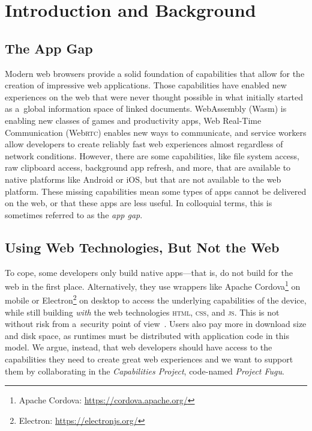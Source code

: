 \documentclass[sigconf]{acmart}
\begin{document}


\maketitle

\section{Introduction and Background}

\subsection{The App Gap}

Modern web browsers provide a solid foundation of capabilities
that allow for the creation of impressive web applications.
Those capabilities have enabled new experiences on the web
that were never thought possible in what initially started as
a~global information space of linked documents.
WebAssembly (Wasm) is enabling new classes of games and productivity apps,
Web Real-Time Communication (Web\textsc{rtc}) enables new ways to communicate,
and service workers allow developers to create reliably fast web experiences
almost regardless of network conditions.
However, there are some capabilities, like file system access,
raw clipboard access, background app refresh, and more,
that are available to native platforms like Android or i\textsc{OS},
but that are not available to the web platform.
These missing capabilities mean some types of apps cannot be delivered on the web,
or that these apps are less useful.
In colloquial terms, this is sometimes referred to as the \textit{app gap}.

\subsection{Using Web Technologies, But Not the Web}

To cope, some developers only build native apps---that is,
do not build for the web in the first place.
Alternatively, they use wrappers like Apache Cordova\footnote{Apache Cordova:
\url{https://cordova.apache.org/}}
on mobile or Electron\footnote{Electron: \url{https://electronjs.org/}} on desktop
to access the underlying capabilities of the device,
while still building \textit{with} the web technologies
\textsc{html}, \textsc{css}, and \textsc{js}.
This is not without risk from a~security point of view~\cite{carettoni17,luo11}.
Users also pay more in download size and disk space,
as runtimes must be distributed with application code in this model.
We argue, instead, that web developers should have access
to the capabilities they need to create great web experiences
and we want to support them by collaborating in the \textit{Capabilities Project},
code-named \textit{Project Fugu}.
\end{document}
